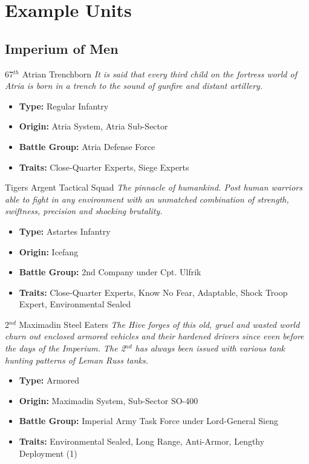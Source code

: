 \chapter{Example Units}
\section{Imperium of Men}
\begin{DndSidebar}{67$^{th}$ Atrian Trenchborn}
\textit{It is said that every third child on the fortress world of Atria is born in a trench to the sound of gunfire and distant artillery.}
\begin{itemize}
	\item \textbf{Type:} Regular Infantry
	\item \textbf{Origin:} Atria System, Atria Sub-Sector
	\item \textbf{Battle Group:} Atria Defense Force 
	\item \textbf{Traits:} Close-Quarter Experts, Siege Experts
\end{itemize}
\end{DndSidebar}

\begin{DndSidebar}{Tigers Argent Tactical Squad}
\textit{The pinnacle of humankind. Post human warriors able to fight in any environment with an unmatched combination of strength, swiftness, precision and shocking brutality.}
\begin{itemize}
	\item \textbf{Type:} Astartes Infantry
	\item \textbf{Origin:} Icefang
	\item \textbf{Battle Group:} 2nd Company under Cpt. Ulfrik 
	\item \textbf{Traits:} Close-Quarter Experts, Know No Fear, Adaptable, Shock Troop Expert, Environmental Sealed
\end{itemize}
\end{DndSidebar}

\begin{DndSidebar}{2$^{nd}$ Maximadin Steel Eaters}
\textit{The Hive forges of this old, gruel and wasted world churn out enclosed armored vehicles and their hardened drivers since even before the days of the Imperium. The 2$^{nd}$ has always been issued with various tank hunting patterns of Leman Russ tanks.}
\begin{itemize}
	\item \textbf{Type:} Armored
	\item \textbf{Origin:} Maximadin System, Sub-Sector SO-400
	\item \textbf{Battle Group:} Imperial Army Task Force under Lord-General Sieng
	\item \textbf{Traits:} Environmental Sealed, Long Range, Anti-Armor, Lengthy Deployment (1)
\end{itemize}
\end{DndSidebar}

